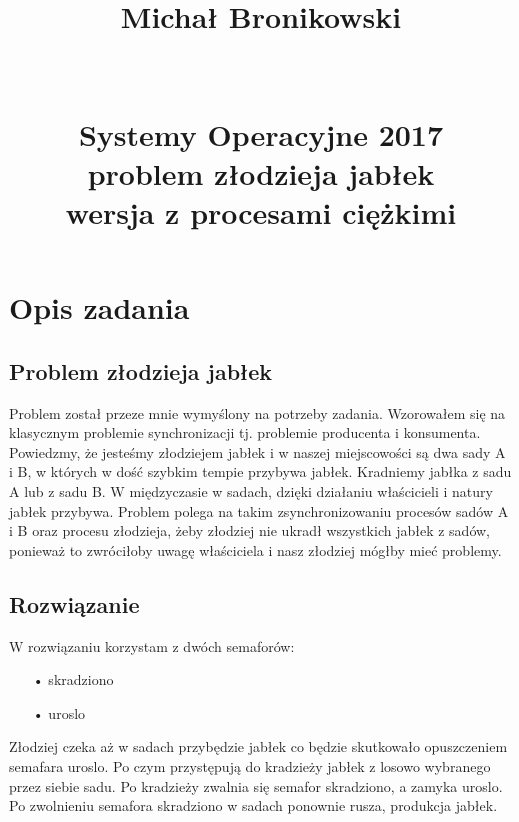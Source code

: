 \documentclass[10pt,a4paper]{article}
\title{Michał Bronikowski\protect\\ \hfill \protect\\ \protect\\ Systemy Operacyjne 2017 \protect\\ problem złodzieja jabłek \protect\\  {\small{wersja z procesami ciężkimi}} } %
\begin{document}
\maketitle  %
\thispagestyle{empty}
\vfill
\newpage
\tableofcontents
\newpage
\normalfont
\large
\section{Opis zadania}
\subsection{Problem złodzieja jabłek}
Problem został przeze mnie wymyślony na potrzeby zadania. Wzorowałem się na klasycznym problemie synchronizacji tj. problemie producenta i konsumenta.
Powiedzmy, że jesteśmy złodziejem jabłek i w naszej miejscowości są dwa sady A i B, w których w dość szybkim tempie przybywa jabłek. Kradniemy jabłka z
sadu A lub z sadu B. W międzyczasie w sadach, dzięki działaniu właścicieli i natury jabłek przybywa. Problem polega na takim zsynchronizowaniu procesów
sadów A i B oraz procesu złodzieja, żeby złodziej nie ukradł wszystkich jabłek z sadów, ponieważ to zwróciłoby uwagę właściciela i nasz złodziej mógłby mieć
problemy.
\subsection{Rozwiązanie}
W rozwiązaniu korzystam z dwóch semaforów:
\begin{itemize}
\item[•] skradziono
\item[•] uroslo
\end{itemize}
Złodziej czeka aż w sadach przybędzie jabłek co będzie skutkowało opuszczeniem semafara \textcolor{Fuksjowy}{uroslo}. Po czym przystępują do kradzieży jabłek z losowo wybranego przez siebie sadu. Po kradzieży zwalnia się semafor \textcolor{Fuksjowy}{skradziono}, a zamyka \textcolor{Fuksjowy}{uroslo}. Po zwolnieniu semafora \textcolor{Fuksjowy}{skradziono} w sadach ponownie rusza, produkcja jabłek.
\end{document}
